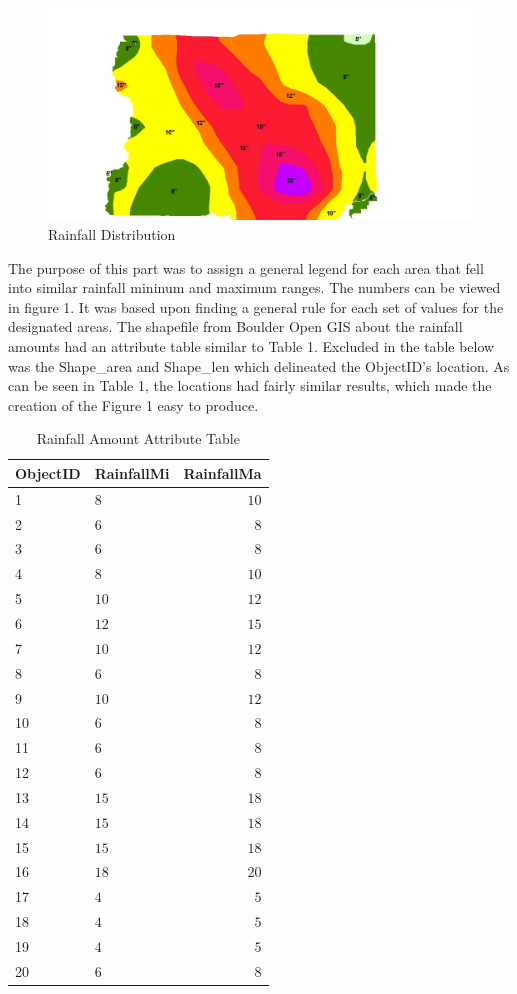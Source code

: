 \documentclass[twoside]{article}
\begin{document}
\begin{multicols}{2}
\begin{figure} %
\includegraphics[width=2\columnwidth]{project.jpg}
\caption{Rainfall Distribution\label{fig:sloth}}
\end{figure}


The purpose of this part was to assign a general legend for each area that fell into similar rainfall mininum and maximum ranges. The numbers can be viewed in figure 1. It was based upon finding a general rule for each set of values for the designated areas. The shapefile from Boulder Open GIS about the rainfall amounts had an attribute table similar to Table 1. Excluded in the table below was the Shape\_area and Shape\_len which delineated the ObjectID's location. As can be seen in Table 1, the locations had fairly similar results, which made the creation of the Figure 1 easy to produce.


\begin{table}[H]
\caption{Rainfall Amount Attribute Table}
\centering
\begin{tabular}{llr}
\cmidrule(r){1-3}
ObjectID & RainfallMi & RainfallMa \\
\midrule
1 & $8$ & $10$  \\
2 & $6$ & $8$ \\
3 & $6$ & $8$ \\
4 & $8$ & $10$ \\
5 & $10$ & $12$ \\
6 & $12$ & $15$ \\
7 & $10$ & $12$ \\
8 & $6$ & $8$ \\
9 & $10$ & $12$ \\
10 & $6$ & $8$ \\
11 & $6$ & $8$ \\
12 & $6$ & $8$ \\
13 & $15$ & $18$ \\
14 & $15$ & $18$ \\
15 & $15$ & $18$ \\
16 & $18$ & $20$ \\
17 & $4$ & $5$ \\
18 & $4$ & $5$ \\
19 & $4$ & $5$ \\
20 & $6$ & $8$ \\
\bottomrule
\end{tabular}
\end{table}



\end{multicols}
\end{document}
